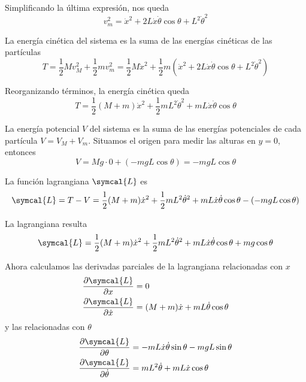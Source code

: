 Simplificando la última expresión, nos queda
\begin{equation}
  v_m^2 = \dot{x}^2 + 2L\dot{x}\dot{\theta}\cos\theta + L^2\dot{\theta}^2
\end{equation}


La energía cinética del sistema es la suma de las energías cinéticas de las partículas
\[
  T = \frac{1}{2} M v_M^2 + \frac{1}{2} m v_m^2
  = \dfrac{1}{2}M\dot{x}^2
  + \dfrac{1}{2}m
  \left(\dot{x}^2 + 2L\dot{x}\dot{\theta}\cos\theta + L^2\dot{\theta}^2
  \right)
\]

Reorganizando términos, la energía cinética queda
\begin{equation}
  T = \dfrac{1}{2}(M+m)\dot{x}^2 + \dfrac{1}{2}mL^2\dot{\theta}^2 + mL\dot{x}\dot{\theta}\cos\theta
\end{equation}

La energía potencial $V$ del sistema es la suma de las energías potenciales de cada partícula
$V = V_M + V_m$. Situamos el origen para medir las alturas en $y=0$, entonces
\begin{equation}
  V = Mg\cdot 0 + (-mgL\cos\theta) = -mgL\cos\theta
\end{equation}

La función lagrangiana $\symcal{L}$ es
\[
  \symcal{L} = T - V
  = \dfrac{1}{2}(M+m)\dot{x}^2 + \dfrac{1}{2}mL^2\dot{\theta}^2 + mL\dot{x}\dot{\theta}\cos\theta
  - (-mgL\cos\theta)
\]

La lagrangiana resulta
\begin{equation}
  \symcal{L}
  = \dfrac{1}{2}(M+m)\dot{x}^2 + \dfrac{1}{2}mL^2\dot{\theta}^2 + mL\dot{x}\dot{\theta}\cos\theta
  + mg\cos\theta
\end{equation}

Ahora calculamos las derivadas parciales de la lagrangiana relacionadas con $x$
\begin{align}
  \frac{\partial\symcal{L}}{\partial x} &= 0\\
  \frac{\partial\symcal{L}}{\partial\dot{x}} &= (M+m)\dot{x} + mL\dot{\theta}\cos\theta
\end{align}
y las relacionadas con $\theta$
\begin{align}
  \frac{\partial\symcal{L}}{\partial\theta} &= -mL\dot{x}\dot{\theta}\sin\theta-mgL\sin\theta\\
  \frac{\partial\symcal{L}}{\partial\dot{\theta}} &= mL^2\dot{\theta} + mL\dot{x}\cos\theta
\end{align}

